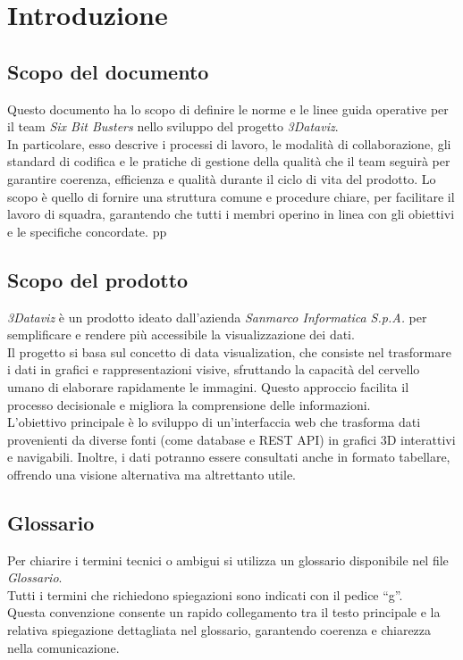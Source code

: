 \section{Introduzione}
    \subsection{Scopo del documento}
    Questo documento ha lo scopo di definire le norme e le linee guida operative per il team \textit{Six Bit Busters} nello sviluppo del progetto \textit{3Dataviz}.\\ 
    In particolare, esso descrive i processi di lavoro, le modalità di collaborazione, gli standard di codifica e le pratiche di gestione della qualità che il team seguirà per garantire coerenza, efficienza e qualità durante il ciclo di vita del prodotto. 
    Lo scopo è quello di fornire una struttura comune e procedure chiare, per facilitare il lavoro di squadra, garantendo che tutti i membri operino in linea con gli obiettivi e le specifiche concordate.
pp
    \subsection{Scopo del prodotto}
    \textit{3Dataviz} è un prodotto ideato dall'azienda \textit{Sanmarco Informatica S.p.A.} per semplificare e rendere più accessibile la visualizzazione dei dati.\\
    Il progetto si basa sul concetto di data visualization, che consiste nel trasformare i dati in grafici e rappresentazioni visive, sfruttando la capacità del cervello umano di elaborare rapidamente le immagini. 
    Questo approccio facilita il processo decisionale e migliora la comprensione delle informazioni.\\
    L’obiettivo principale è lo sviluppo di un’interfaccia web che trasforma dati provenienti da diverse fonti (come database e REST API) in grafici 3D interattivi e navigabili. 
    Inoltre, i dati potranno essere consultati anche in formato tabellare, offrendo una visione alternativa ma altrettanto utile.  

    \subsection{Glossario}
    Per chiarire i termini tecnici o ambigui si utilizza un glossario disponibile nel file \textit{Glossario}.\\
    Tutti i termini che richiedono spiegazioni sono indicati con il pedice “g”. \\
    Questa convenzione consente un rapido collegamento tra il testo principale e la relativa spiegazione dettagliata nel glossario, garantendo coerenza e chiarezza nella comunicazione.

